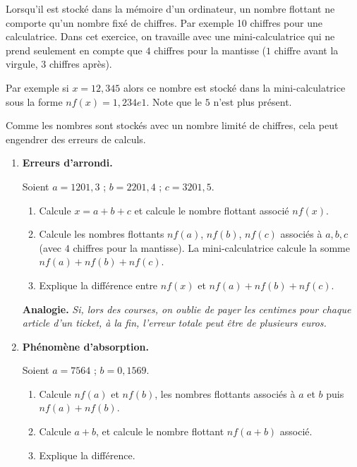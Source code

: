 \documentclass[class=report,crop=false,12pt]{standalone}
\begin{document}
\begin{activite}

Lorsqu'il est stocké dans la mémoire d'un ordinateur, un nombre flottant ne comporte qu'un nombre fixé de chiffres. Par exemple 10 chiffres pour une calculatrice. Dans cet exercice, on travaille avec une mini-calculatrice qui ne prend seulement en compte que $4$ chiffres pour la mantisse ($1$ chiffre avant la virgule, $3$ chiffres après).  

Par exemple si $x = 12,345$ alors ce nombre est stocké dans la mini-calculatrice sous la forme $nf(x) = 1,234e1$. Note que le $5$ n'est plus présent.

Comme les nombres sont stockés avec un nombre limité de chiffres, cela peut engendrer des erreurs de calculs.

\begin{enumerate}
  \item \textbf{Erreurs d'arrondi.}

    Soient $a = 1201,3$ ; $b = 2201,4$ ; $c = 3201,5$.
  \begin{enumerate}
    \item Calcule $x = a + b + c$ et calcule le nombre flottant associé $nf(x)$.
    \item Calcule les nombres flottants $nf(a)$, $nf(b)$, $nf(c)$ associés à $a, b, c$ (avec $4$ chiffres pour la mantisse). La mini-calculatrice calcule la somme $nf(a) + nf(b) + nf(c)$.
    \item Explique la différence entre $nf(x)$ et $nf(a) + nf(b) + nf(c)$.
  \end{enumerate}

    \textbf{Analogie.} \emph{Si, lors des courses, on oublie de payer les centimes pour chaque article d'un ticket, à la fin, l'erreur totale peut être de plusieurs euros.}
  
  \item \textbf{Phénomène d'absorption.}

    Soient $a = 7564$ ; $b = 0,1569$.
  \begin{enumerate}
    \item Calcule $nf(a)$ et $nf(b)$, les nombres flottants associés à $a$ et $b$ puis $nf(a) + nf(b)$.
    \item Calcule $a + b$, et calcule le nombre flottant $nf(a + b)$ associé.
    \item Explique la différence.
  \end{enumerate}


\end{enumerate}
\end{activite}
\end{document}

